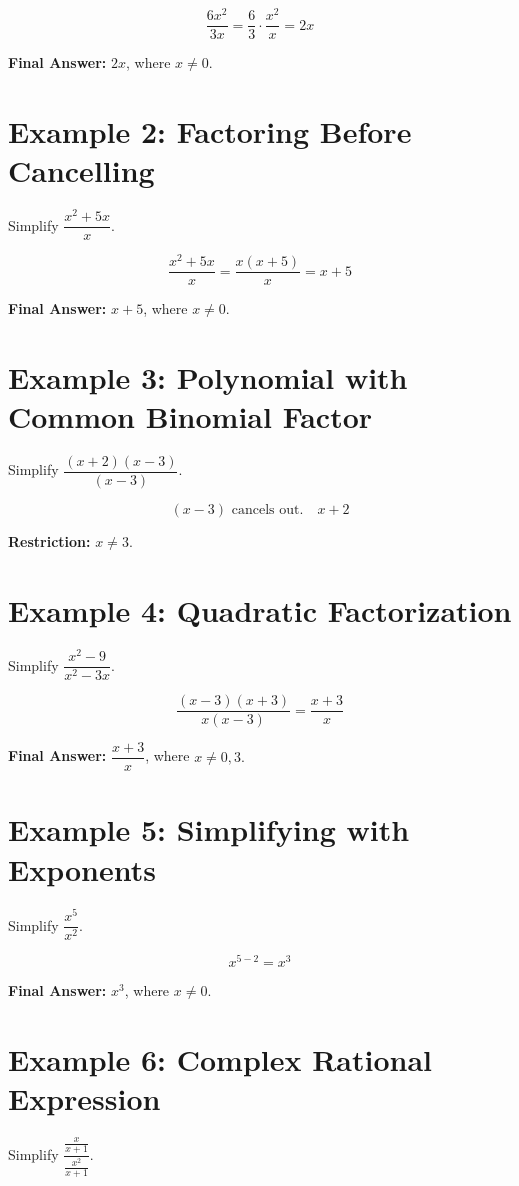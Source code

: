 \documentclass[12pt]{article}
\begin{document}
\[
\dfrac{6x^2}{3x} = \dfrac{6}{3} \cdot \dfrac{x^2}{x} = 2x
\]

\textbf{Final Answer:} \(\boxed{2x}\), where \(x \ne 0.\)

\section*{Example 2: Factoring Before Cancelling}

Simplify \(\dfrac{x^2 + 5x}{x}\).

\[
\dfrac{x^2 + 5x}{x} = \dfrac{x(x + 5)}{x} = x + 5
\]

\textbf{Final Answer:} \(\boxed{x + 5}\), where \(x \ne 0.\)

\section*{Example 3: Polynomial with Common Binomial Factor}

Simplify \(\dfrac{(x + 2)(x - 3)}{(x - 3)}\).

\[
(x - 3)\text{ cancels out.} \quad \boxed{x + 2}
\]

\textbf{Restriction:} \(x \ne 3.\)

\section*{Example 4: Quadratic Factorization}

Simplify \(\dfrac{x^2 - 9}{x^2 - 3x}\).

\[
\dfrac{(x - 3)(x + 3)}{x(x - 3)} = \dfrac{x + 3}{x}
\]

\textbf{Final Answer:} \(\boxed{\dfrac{x + 3}{x}}\), where \(x \ne 0, 3.\)

\section*{Example 5: Simplifying with Exponents}

Simplify \(\dfrac{x^5}{x^2}\).

\[
x^{5 - 2} = x^3
\]

\textbf{Final Answer:} \(\boxed{x^3}\), where \(x \ne 0.\)

\section*{Example 6: Complex Rational Expression}

Simplify \(\dfrac{\frac{x}{x+1}}{\frac{x^2}{x+1}}\).
\end{document}
